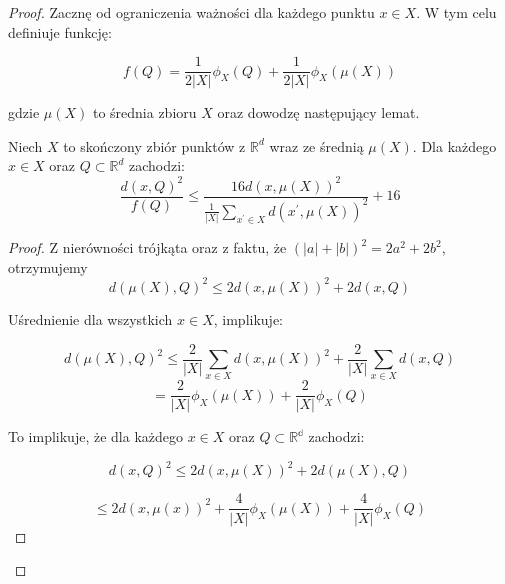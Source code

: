 \begin{proof}

\noindent
Zacznę od ograniczenia ważności dla każdego punktu $x \in X$. 
W tym celu definiuje funkcję:

\begin{equation}
    f(Q) = \frac{1}{2|X|}\phi_{X}(Q) + \frac{1}{2|X|}\phi_{X}(\mu(X))
\end{equation}

\noindent
gdzie $\mu(X)$ to średnia zbioru $X$ oraz dowodzę następujący lemat. 

\begin{lemma}{\cite{bachem2017scalable}}
    Niech $X$ to skończony zbiór punktów z $\mathbb{R}^{d}$ wraz ze średnią $\mu(X)$. 
    Dla każdego $x \in X$ oraz $Q \subset \mathbb{R}^{d}$ zachodzi:
    \begin{equation}
        \frac{d(x, Q)^2}{f(Q)} \leq \frac{16d(x, \mu(X))^2}{\frac{1}{|X|}\sum_{x^{'} \in X}d(x^{'}, \mu(X))^2} + 16
    \end{equation}
\end{lemma}

\begin{proof}
    \noindent
    Z nierówności trójkąta oraz z faktu, że $(|a| + |b|)^2 = 2a^2 + 2b^2$, otrzymujemy
    \begin{equation}
        d(\mu(X), Q)^2 \leq 2d(x, \mu(X))^2 + 2d(x, Q)
    \end{equation}
    
    \noindent
    Uśrednienie dla wszystkich $x \in X$, implikuje:

    \begin{equation}
        d(\mu(X), Q)^2 \leq \frac{2}{|X|} \sum_{x \in X} d(x, \mu(X))^2 + \frac{2}{|X|} \sum_{x \in X} d(x, Q)
    \end{equation}
    \begin{equation}
       = \frac{2}{|X|} \phi_{X}(\mu(X))+ \frac{2}{|X|} \phi_{X}(Q)
    \end{equation}

    \noindent
    To implikuje, że dla każdego $x \in X$ oraz $Q \subset \mathbb{R^d}$ zachodzi:

    \begin{equation}
        d(x, Q)^2 \leq 2d(x, \mu(X))^2 + 2d(\mu(X), Q)
    \end{equation}

    \begin{equation}
       \leq 2d(x, \mu(x))^2 +  \frac{4}{|X|} \phi_{X}(\mu(X))+ \frac{4}{|X|} \phi_{X}(Q)
    \end{equation}


\end{proof}
\end{proof}
